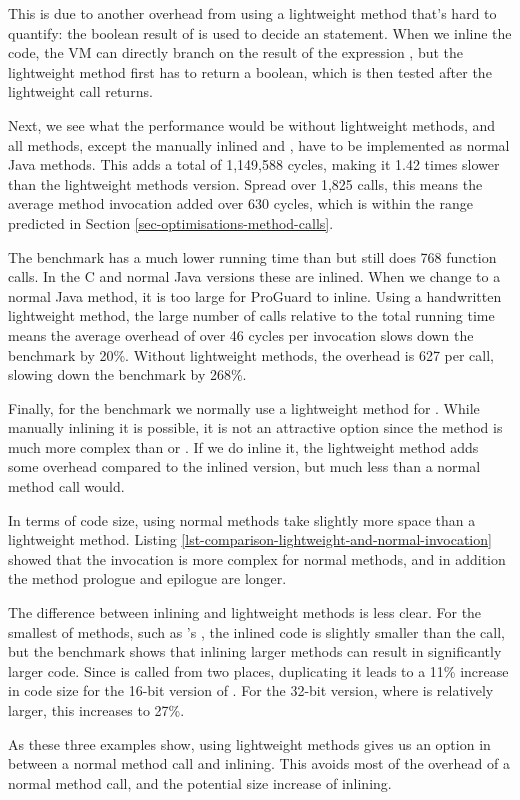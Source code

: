 This is due to another overhead from using a lightweight method that's hard to quantify: the boolean result of  is used to decide an  statement. When we inline the code, the VM can directly branch on the result of the expression , but the lightweight method first has to return a boolean, which is then tested after the lightweight call returns.

Next, we see what the performance would be without lightweight methods, and all methods, except the manually inlined  and , have to be implemented as normal Java methods. This adds a total of 1,149,588 cycles, making it 1.42 times slower than the lightweight methods version. Spread over 1,825 calls, this means the average method invocation added over 630 cycles, which is within the range predicted in Section \ref{sec-optimisations-method-calls}.

The  benchmark has a much lower running time than  but still does 768 function calls. In the C and normal Java versions these are inlined. When we change  to a normal Java method, it is too large for ProGuard to inline. Using a handwritten lightweight method, the large number of calls relative to the total running time means the average overhead of over 46 cycles per invocation slows down the benchmark by 20\%. Without lightweight methods, the overhead is 627 per call, slowing down the benchmark by 268\%.

Finally, for the  benchmark we normally use a lightweight method for . While manually inlining it is possible, it is not an attractive option since the  method is much more complex than  or . If we do inline it, the lightweight method adds some overhead compared to the inlined version, but much less than a normal method call would.

In terms of code size, using normal methods take slightly more space than a lightweight method. Listing \ref{lst-comparison-lightweight-and-normal-invocation} showed that the invocation is more complex for normal methods, and in addition the method prologue and epilogue are longer.

The difference between inlining and lightweight methods is less clear. For the smallest of methods, such as 's , the inlined code is slightly smaller than the call, but the  benchmark shows that inlining larger methods can result in significantly larger code. Since  is called from two places, duplicating it leads to a 11\% increase in code size for the 16-bit version of . For the 32-bit version, where  is relatively larger, this increases to 27\%.

As these three examples show, using lightweight methods gives us an option in between a normal method call and inlining. This avoids most of the overhead of a normal method call, and the potential size increase of inlining.



